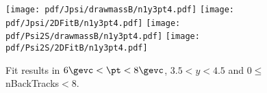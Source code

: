 \begin{figure}[H]
\begin{center}
\texttt{[image: pdf/Jpsi/drawmassB/n1y3pt4.pdf]}
\texttt{[image: pdf/Jpsi/2DFitB/n1y3pt4.pdf]}
\vspace*{-0.5cm}
\texttt{[image: pdf/Psi2S/drawmassB/n1y3pt4.pdf]}
\texttt{[image: pdf/Psi2S/2DFitB/n1y3pt4.pdf]}
\vspace*{-0.5cm}
\end{center}
\caption{Fit results in $6\gevc<\pt<8\gevc$, $3.5<y<4.5$ and 0$\leq$nBackTracks$<$8.}
\label{Fitn1y3pt4}
\end{figure}
